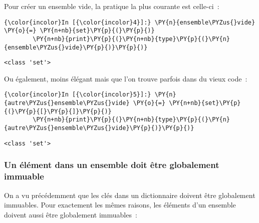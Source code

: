     Pour créer un ensemble vide, la pratique la plus courante est celle-ci~:

    \begin{Verbatim}[commandchars=\\\{\},frame=single,framerule=0.3mm,rulecolor=\color{cellframecolor}]
{\color{incolor}In [{\color{incolor}4}]:} \PY{n}{ensemble\PYZus{}vide} \PY{o}{=} \PY{n+nb}{set}\PY{p}{(}\PY{p}{)}
        \PY{n+nb}{print}\PY{p}{(}\PY{n+nb}{type}\PY{p}{(}\PY{n}{ensemble\PYZus{}vide}\PY{p}{)}\PY{p}{)}
\end{Verbatim}


    \begin{Verbatim}[commandchars=\\\{\},frame=single,framerule=0.3mm,rulecolor=\color{cellframecolor}]
<class 'set'>
\end{Verbatim}

    Ou également, moins élégant mais que l'on trouve parfois dans du vieux
code~:

    \begin{Verbatim}[commandchars=\\\{\},frame=single,framerule=0.3mm,rulecolor=\color{cellframecolor}]
{\color{incolor}In [{\color{incolor}5}]:} \PY{n}{autre\PYZus{}ensemble\PYZus{}vide} \PY{o}{=} \PY{n+nb}{set}\PY{p}{(}\PY{p}{[}\PY{p}{]}\PY{p}{)}
        \PY{n+nb}{print}\PY{p}{(}\PY{n+nb}{type}\PY{p}{(}\PY{n}{autre\PYZus{}ensemble\PYZus{}vide}\PY{p}{)}\PY{p}{)}
\end{Verbatim}


    \begin{Verbatim}[commandchars=\\\{\},frame=single,framerule=0.3mm,rulecolor=\color{cellframecolor}]
<class 'set'>
\end{Verbatim}

    \hypertarget{un-uxe9luxe9ment-dans-un-ensemble-doit-uxeatre-globalement-immuable}{%
\subsubsection{Un élément dans un ensemble doit être globalement
immuable}\label{un-uxe9luxe9ment-dans-un-ensemble-doit-uxeatre-globalement-immuable}}

    On a vu précédemment que les clés dans un dictionnaire doivent être
globalement immuables. Pour exactement les mêmes raisons, les éléments
d'un ensemble doivent aussi être globalement immuables~:

